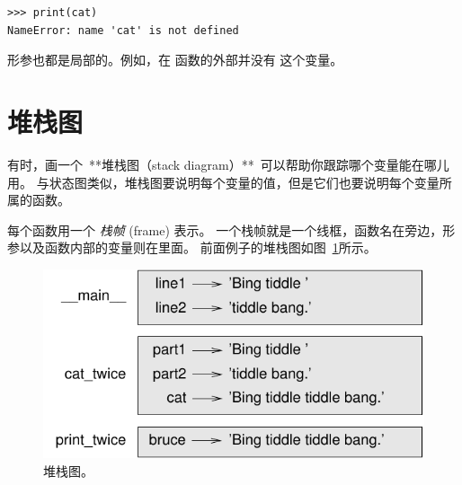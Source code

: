 \begin{lstlisting}
>>> print(cat)
NameError: name 'cat' is not defined
\end{lstlisting}

%

形参也都是局部的。例如，在  函数的外部并没有  这个变量。


%
\section{堆栈图}
\label{stackdiagram}
    
    


有时，画一个\ **堆栈图（stack diagram）**\ 可以帮助你跟踪哪个变量能在哪儿用。
与状态图类似，堆栈图要说明每个变量的值，但是它们也要说明每个变量所属的函数。
  


每个函数用一个 {\em 栈帧} (frame) 表示。
一个栈帧就是一个线框，函数名在旁边，形参以及函数内部的变量则在里面。
前面例子的堆栈图如图~\ref{fig.stack}所示。

\begin{figure}
\centerline
{\includegraphics[scale=0.8]{../source/figs/stack.pdf}}
\caption{堆栈图。}
\label{fig.stack}
\end{figure}

